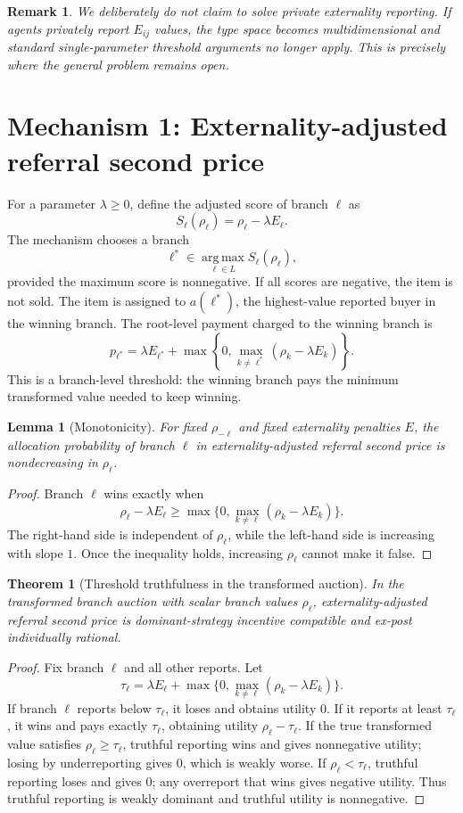 \documentclass[11pt]{article}
\newtheorem{theorem}{Theorem}
\newtheorem{lemma}{Lemma}
\newtheorem{remark}{Remark}
\newcommand{\argmax}{\operatorname*{arg\,max}}
\begin{document}
\begin{remark}
We deliberately do not claim to solve \emph{private} externality reporting. If agents privately report $E_{ij}$ values, the type space becomes multidimensional and standard single-parameter threshold arguments no longer apply. This is precisely where the general problem remains open.
\end{remark}

\section{Mechanism 1: Externality-adjusted referral second price}

For a parameter $\lambda\ge 0$, define the adjusted score of branch $\ell$ as
\[
    S_\ell(\rho_\ell)=\rho_\ell-\lambda E_\ell.
\]
The mechanism chooses a branch
\[
    \ell^*\in \argmax_{\ell\in L} S_\ell(\rho_\ell),
\]
provided the maximum score is nonnegative. If all scores are negative, the item is not sold. The item is assigned to $a(\ell^*)$, the highest-value reported buyer in the winning branch. The root-level payment charged to the winning branch is
\[
    p_{\ell^*}=\lambda E_{\ell^*}+\max\left\{0,\max_{k\ne \ell^*} (\rho_k-\lambda E_k)\right\}.
\]
This is a branch-level threshold: the winning branch pays the minimum transformed value needed to keep winning.

\begin{lemma}[Monotonicity]
For fixed $\rho_{-\ell}$ and fixed externality penalties $E$, the allocation probability of branch $\ell$ in externality-adjusted referral second price is nondecreasing in $\rho_\ell$.
\end{lemma}
\begin{proof}
Branch $\ell$ wins exactly when
\[
\rho_\ell-\lambda E_\ell\ge \max\{0,\max_{k\ne \ell}(\rho_k-\lambda E_k)\}.
\]
The right-hand side is independent of $\rho_\ell$, while the left-hand side is increasing with slope $1$. Once the inequality holds, increasing $\rho_\ell$ cannot make it false.
\end{proof}

\begin{theorem}[Threshold truthfulness in the transformed auction]
In the transformed branch auction with scalar branch values $\rho_\ell$, externality-adjusted referral second price is dominant-strategy incentive compatible and ex-post individually rational.
\end{theorem}
\begin{proof}
Fix branch $\ell$ and all other reports. Let
\[
\tau_\ell=\lambda E_\ell+\max\{0,\max_{k\ne \ell}(\rho_k-\lambda E_k)\}.
\]
If branch $\ell$ reports below $\tau_\ell$, it loses and obtains utility $0$. If it reports at least $\tau_\ell$, it wins and pays exactly $\tau_\ell$, obtaining utility $\rho_\ell-\tau_\ell$. If the true transformed value satisfies $\rho_\ell\ge \tau_\ell$, truthful reporting wins and gives nonnegative utility; losing by underreporting gives $0$, which is weakly worse. If $\rho_\ell<\tau_\ell$, truthful reporting loses and gives $0$; any overreport that wins gives negative utility. Thus truthful reporting is weakly dominant and truthful utility is nonnegative.
\end{proof}
\end{document}
